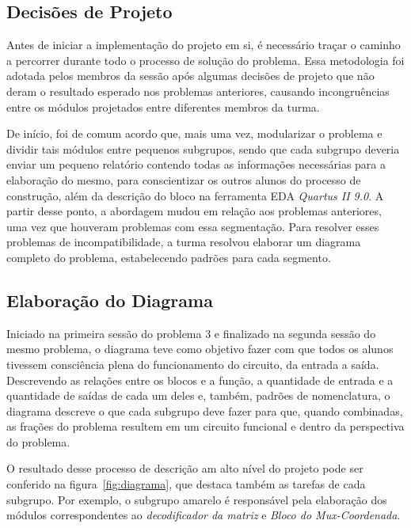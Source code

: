 \documentclass[12pt]{article}
\begin{document}
\subsection{Decisões de Projeto}

Antes de iniciar a implementação do projeto em si, é necessário traçar o caminho a percorrer durante todo o processo de solução do problema. Essa metodologia foi adotada pelos membros da sessão após algumas decisões de projeto que não deram o resultado esperado nos problemas anteriores, causando incongruências entre os módulos projetados entre diferentes membros da turma. 

De início, foi de comum acordo que, mais uma vez, modularizar o problema e dividir tais módulos entre pequenos subgrupos, sendo que cada subgrupo deveria enviar um pequeno relatório contendo todas as informações necessárias para a elaboração do mesmo, para conscientizar os outros alunos do processo de construção, além da descrição do bloco na ferramenta EDA \textit{Quartus II 9.0}. A partir desse ponto, a abordagem mudou em relação aos problemas anteriores, uma vez que houveram problemas com essa segmentação. Para resolver esses problemas de incompatibilidade, a turma resolvou elaborar um diagrama completo do problema, estabelecendo padrões para cada segmento.

\subsection{Elaboração do Diagrama}
Iniciado na primeira sessão do problema 3 e finalizado na segunda sessão do mesmo problema, o diagrama teve como objetivo fazer com que todos os alunos tivessem consciência plena do funcionamento do circuito, da entrada a saída. Descrevendo as relações entre os blocos e a função, a quantidade de entrada e a quantidade de saídas de cada um deles e, também,  padrões de nomenclatura, o diagrama descreve o que cada subgrupo deve fazer para que, quando combinadas, as frações do problema resultem em um circuito funcional e dentro da perspectiva do problema. 

O resultado desse processo de descrição am alto nível do projeto pode ser conferido na figura~\ref{fig:diagrama}, que destaca também as tarefas de cada subgrupo. Por exemplo, o subgrupo amarelo é responsável pela elaboração dos módulos correspondentes ao \textit{decodificador da matriz} e \textit{Bloco do Mux-Coordenada}.
\end{document}
